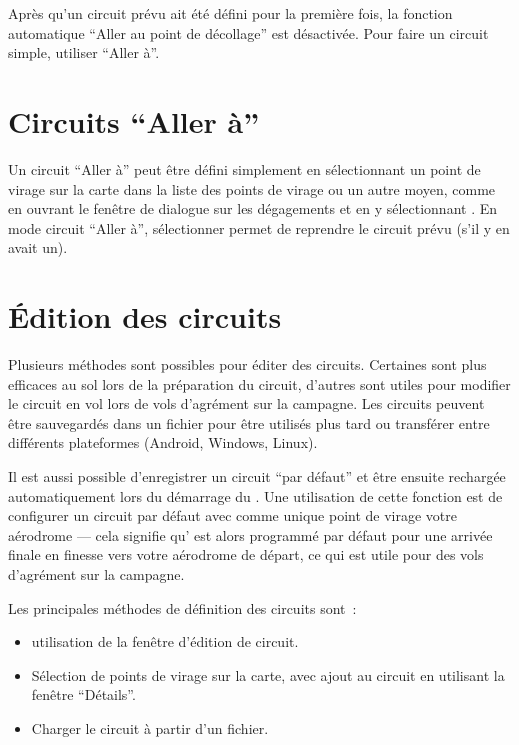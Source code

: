 Après qu'un circuit prévu ait été défini pour la première fois, la fonction automatique ``Aller au point de décollage''
est désactivée. Pour faire un circuit simple, utiliser ``Aller à''.

\section{Circuits ``Aller à''}

Un circuit ``Aller à'' peut être défini simplement en sélectionnant un point de virage sur la carte
dans la liste des points de virage ou un autre moyen, comme en ouvrant le fenêtre de dialogue sur les dégagements
et en y sélectionnant . En mode circuit ``Aller à'', sélectionner
\blink{}
permet de reprendre le circuit prévu (s’il y en avait un).

\section{Édition des circuits}

Plusieurs méthodes sont possibles pour éditer des circuits. Certaines sont plus efficaces au sol lors
de la préparation du circuit, d'autres sont utiles pour modifier le circuit en vol lors
de vols d'agrément sur la campagne. Les circuits peuvent être sauvegardés dans
un fichier pour être utilisés plus tard ou transférer entre différents plateformes \xc{}
(Android, Windows, Linux\textellipsis).

\tip{} Il est aussi possible d'enregistrer un circuit ``par défaut'' et être ensuite rechargée
automatiquement lors du démarrage du \xc. Une utilisation de cette fonction est de
configurer un circuit par défaut avec comme unique point de virage votre aérodrome --- cela signifie
qu'\xc{} est alors programmé par défaut pour une arrivée finale en finesse vers votre aérodrome de départ, ce qui
est utile pour des vols d'agrément sur la campagne.

Les principales méthodes de définition des circuits sont~:
\begin{itemize}
\item utilisation de la fenêtre d'édition de circuit.
\item Sélection de points de virage sur la carte, avec ajout au circuit en utilisant la fenêtre ``Détails''.
\item Charger le circuit à partir d'un fichier.
\end{itemize}


